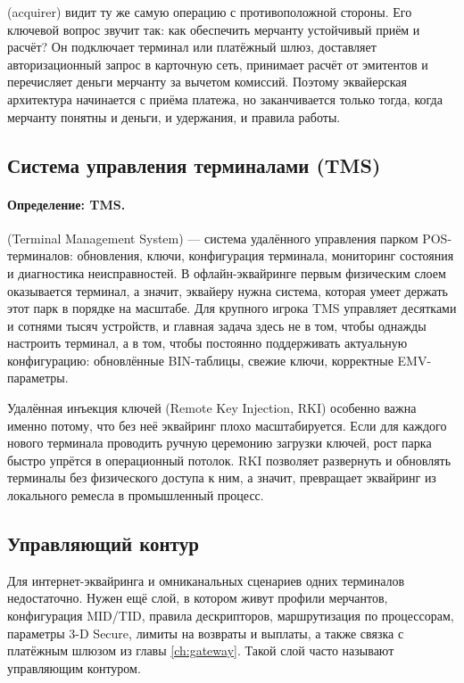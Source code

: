 (acquirer) видит ту же самую операцию с противоположной
стороны. Его ключевой вопрос звучит так: как обеспечить мерчанту
устойчивый приём и расчёт?
Он подключает терминал или платёжный шлюз, доставляет
авторизационный запрос в карточную сеть, принимает расчёт
от эмитентов и перечисляет деньги мерчанту за вычетом комиссий.
Поэтому эквайерская архитектура начинается с приёма платежа,
но заканчивается только тогда, когда мерчанту понятны и деньги,
и удержания, и правила работы.

\subsection*{Система управления терминалами (TMS)}

\paragraph{Определение: TMS.}
 (Terminal Management System) --- система удалённого управления парком POS-терминалов: обновления, ключи, конфигурация терминала, мониторинг состояния и диагностика неисправностей.
В офлайн-эквайринге первым физическим слоем оказывается терминал,
а значит, эквайеру нужна система, которая умеет держать этот парк
в порядке на масштабе. Для крупного игрока TMS управляет
десятками и сотнями тысяч устройств, и главная задача здесь
не в том, чтобы однажды настроить терминал, а в том, чтобы
постоянно поддерживать актуальную конфигурацию: обновлённые
BIN-таблицы, свежие ключи, корректные EMV-параметры.

Удалённая инъекция ключей (Remote Key Injection, RKI) особенно
важна именно потому, что без неё эквайринг плохо масштабируется.
Если для каждого нового терминала проводить ручную церемонию
загрузки ключей, рост парка быстро упрётся в операционный потолок.
RKI позволяет развернуть и обновлять терминалы без физического
доступа к ним, а значит, превращает эквайринг из локального
ремесла в промышленный процесс.\cite{visa-tpa-registration-program-faqs}

\subsection*{Управляющий контур}

Для интернет-эквайринга и омниканальных сценариев одних терминалов
недостаточно. Нужен ещё слой, в котором живут профили мерчантов,
конфигурация MID/TID, правила дескрипторов, маршрутизация
по процессорам, параметры 3-D Secure, лимиты на возвраты
и выплаты, а также связка с платёжным шлюзом из главы
\ref{ch:gateway}. Такой слой часто называют управляющим
контуром.


